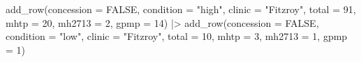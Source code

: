 \documentclass[
  letterpaper,
  DIV=11,
  numbers=noendperiod,
  oneside]{scrartcl}
\newenvironment{Shaded}{\begin{snugshade}}{\end{snugshade}}
\newcommand{\AttributeTok}[1]{\textcolor[rgb]{0.40,0.45,0.13}{#1}}
\newcommand{\ConstantTok}[1]{\textcolor[rgb]{0.56,0.35,0.01}{#1}}
\newcommand{\DecValTok}[1]{\textcolor[rgb]{0.68,0.00,0.00}{#1}}
\newcommand{\FunctionTok}[1]{\textcolor[rgb]{0.28,0.35,0.67}{#1}}
\newcommand{\NormalTok}[1]{\textcolor[rgb]{0.00,0.23,0.31}{#1}}
\newcommand{\SpecialCharTok}[1]{\textcolor[rgb]{0.37,0.37,0.37}{#1}}
\newcommand{\StringTok}[1]{\textcolor[rgb]{0.13,0.47,0.30}{#1}}
\begin{document}
\begin{Shaded}
\begin{Highlighting}[]
  \FunctionTok{add\_row}\NormalTok{(}\AttributeTok{concession =} \ConstantTok{FALSE}\NormalTok{, }\AttributeTok{condition =} \StringTok{"high"}\NormalTok{, }\AttributeTok{clinic =} \StringTok{"Fitzroy"}\NormalTok{, }\AttributeTok{total =} \DecValTok{91}\NormalTok{, }\AttributeTok{mhtp =} \DecValTok{20}\NormalTok{, }\AttributeTok{mh2713 =} \DecValTok{2}\NormalTok{, }\AttributeTok{gpmp =} \DecValTok{14}\NormalTok{) }\SpecialCharTok{|\textgreater{}}
  \FunctionTok{add\_row}\NormalTok{(}\AttributeTok{concession =} \ConstantTok{FALSE}\NormalTok{, }\AttributeTok{condition =} \StringTok{"low"}\NormalTok{, }\AttributeTok{clinic =} \StringTok{"Fitzroy"}\NormalTok{, }\AttributeTok{total =} \DecValTok{10}\NormalTok{, }\AttributeTok{mhtp =} \DecValTok{3}\NormalTok{, }\AttributeTok{mh2713 =} \DecValTok{1}\NormalTok{, }\AttributeTok{gpmp =} \DecValTok{1}\NormalTok{)}
\end{Highlighting}
\end{Shaded}
\end{document}
